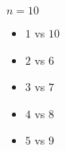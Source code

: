 \documentclass[8pt]{extarticle}
\begin{document}
\begin{problem}{12}
\begin{problem}{$n=10$}
\begin{description}[font=\normalfont\scshape]
\begin{itemize}
          \end{itemize}
        \item[Day 5:]\hfill
          \begin{itemize}
            \item $1$ vs $10$
            \item $2$ vs $6$
            \item $3$ vs $7$
            \item $4$ vs $8$
            \item $5$ vs $9$
          \end{itemize}
      \end{description}
    \end{problem}
  \end{problem}
\end{document}
